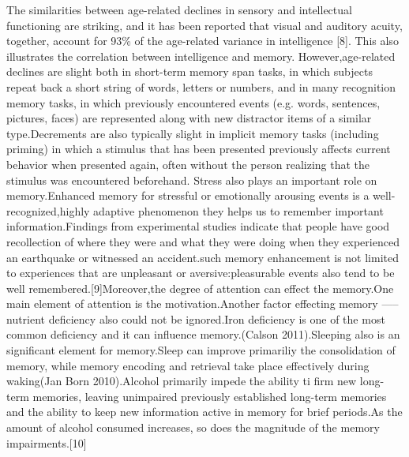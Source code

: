 \documentclass{article}
\begin{document}
The similarities between age-related declines in sensory and intellectual functioning are striking, and it has been reported that visual and auditory acuity, together, account for 93\% of the age-related variance in intelligence [8]. This also illustrates the correlation between intelligence and memory. However,age-related declines are  slight both in short-term memory span tasks, in which subjects repeat back a short string of words, letters or  numbers, and in many recognition memory tasks, in which  previously encountered events (e.g. words, sentences, pictures, faces) are represented along with new distractor items of a similar type.Decrements are also typically slight in implicit memory tasks (including priming) in which a stimulus that has been presented previously affects current behavior when presented again, often without the person realizing that the stimulus was encountered beforehand. Stress also plays an important role on memory.Enhanced memory for stressful or emotionally arousing events is a well-recognized,highly adaptive phenomenon they helps us to remember important information.Findings from experimental studies indicate that people have good recollection of where they were and what they were doing when they experienced an earthquake or witnessed an accident.such memory enhancement is not limited to experiences that are unpleasant or aversive:pleasurable events also tend to be well remembered.[9]Moreover,the degree of attention can effect the memory.One main element  of attention is the motivation.Another factor effecting memory -----nutrient deficiency also could not be ignored.Iron deficiency is one of the most common deficiency and it can influence memory.(Calson 2011).Sleeping also is an significant element for memory.Sleep can improve primariliy the consolidation of memory, while memory encoding and retrieval take place effectively during waking(Jan Born 2010).Alcohol primarily impede the ability ti firm new long-term memories, leaving unimpaired previously established long-term memories and the ability to keep new information active in memory for brief periods.As the amount of alcohol consumed increases, so does the magnitude of the memory impairments.[10]


\printbibliography[title={Reference},heading=bibnumbered]{}
\end{document}
